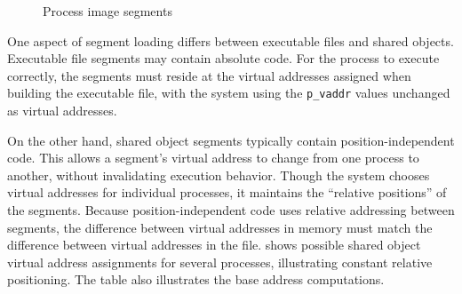 \documentclass[english,11pt,twoside,toc=bib,toc=idx]{scrreprt}
\begin{document}
\begin{figure}
  \fi
\caption{Process image segments}
\label{fig:pimgseg}
\end{figure}

One aspect of segment loading differs between executable files and
shared objects.  Executable file segments may contain absolute code.
For the process to execute correctly, the segments must reside at the
virtual addresses assigned when building the executable file, with the
system using the \texttt{p\_vaddr} values unchanged as virtual
addresses.

On the other hand, shared object segments typically contain
position-independent code.  This allows a segment's virtual address to
change from one process to another, without invalidating execution
behavior.  Though the system chooses virtual addresses for individual
processes, it maintains the ``relative positions'' of the
segments.  Because position-independent code uses relative addressing
between segments, the difference between virtual addresses in memory
must match the difference between virtual addresses in the
file.   shows possible shared object virtual
address assignments for several processes, illustrating constant
relative positioning.  The table also illustrates the base address
computations.
\end{document}
